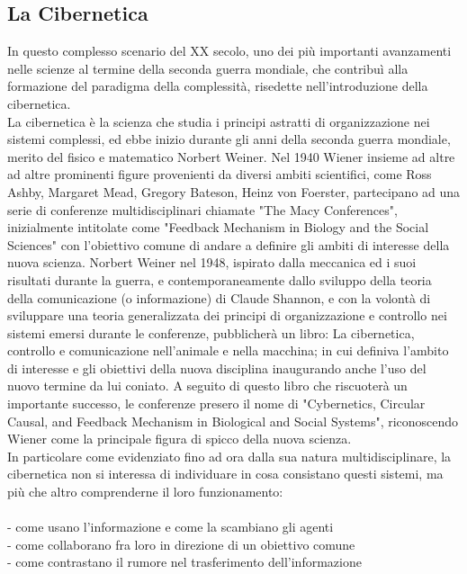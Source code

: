 \subsection{La Cibernetica}
\label{sec:La Cibernetica}
In questo complesso scenario del XX secolo,
uno dei più importanti avanzamenti nelle scienze
al termine della seconda guerra mondiale, che contribuì alla
formazione del paradigma della complessità, risedette nell'introduzione della
cibernetica. \\
La cibernetica è la scienza che studia i principi astratti di organizzazione
nei sistemi complessi, ed ebbe inizio durante gli anni della seconda guerra
mondiale, merito del fisico e matematico Norbert Weiner.
Nel 1940 Wiener insieme ad altre ad altre prominenti figure provenienti
da diversi ambiti scientifici,
come Ross Ashby, Margaret Mead, Gregory Bateson, Heinz von Foerster,
partecipano ad una serie di conferenze
multidisciplinari chiamate "The Macy Conferences", inizialmente intitolate come
"Feedback Mechanism in Biology and the Social Sciences"
con l'obiettivo comune di andare a definire
gli ambiti di interesse della nuova scienza.
Norbert Weiner nel 1948,
ispirato dalla meccanica ed i suoi risultati durante la guerra,
e contemporaneamente dallo sviluppo della teoria della comunicazione
(o informazione) di Claude Shannon,
e con la volontà di sviluppare una teoria generalizzata dei principi di
organizzazione e controllo nei sistemi emersi durante le conferenze,
pubblicherà un libro:
La cibernetica, controllo e comunicazione nell'animale e nella macchina;
in cui definiva l'ambito di interesse e gli obiettivi della nuova disciplina
inaugurando anche l'uso del nuovo termine da lui coniato.
A seguito di questo libro che riscuoterà
un importante successo, le conferenze presero il nome di
"Cybernetics, Circular Causal, and Feedback Mechanism
in Biological and Social Systems",
riconoscendo Wiener come la principale figura di spicco della nuova scienza. \\
In particolare come evidenziato fino ad ora dalla sua natura multidisciplinare,
la cibernetica non si interessa di individuare in
cosa consistano questi sistemi,
ma più che altro comprenderne il loro funzionamento:
\\ \\
- come usano l'informazione e come la scambiano gli agenti
\\
- come collaborano fra loro in direzione di un obiettivo comune
\\
- come contrastano il rumore nel trasferimento dell'informazione
\\
